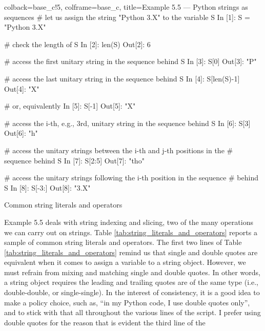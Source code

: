 \documentclass[a4paper,11pt]{book}
\newcommand{\question}[1]{%
    \begin{tcolorbox}[colback=comp_c!10,colframe=comp_c,sidebyside align=top,width=\linewidth,before skip=1ex]
        #1
    \end{tcolorbox}%
    \switchcolumn%
}
\newcommand{\note}[1]{%
    \begin{tcolorbox}[colback=white!0,colframe=white!10,width=\linewidth,before skip=1ex]
        #1
    \end{tcolorbox}         
}
\begin{document}
\begin{pythoncode}[linenos=true,]{colback=base_c!5, colframe=base_c, title=\sffamily Example 5.5 --- Python strings as sequences}
# let us assign the string "Python 3.X" to the variable S
In [1]: S = "Python 3.X"

# check the length of S
In [2]: len(S)
Out[2]: 6

# access the first unitary string in the sequence behind S 	
In [3]: S[0]
Out[3]: "P"

# access the last unitary string in the sequence behind S
In [4]: S[len(S)-1]
Out[4]: "X"

# or, equivalently
In [5]: S[-1]
Out[5]: "X"

# access the i-th, e.g., 3rd, unitary string in the sequence behind S
In [6]: S[3]
Out[6]: "h"

# access the unitary strings between the i-th and j-th positions in the 
# sequence behind S
In [7]: S[2:5]
Out[7]: "tho"

# access the unitary strings following the i-th position in the sequence 
# behind S
In [8]: S[-3:]
Out[8]: "3.X"

\end{pythoncode}

\begin{paracol}{2}
	\question{\raggedright Common string literals and operators}
	\note{Example 5.5 deals with string indexing and slicing, two of the many operations we can carry out on strings. Table \ref{tab:string_literals_and_operators} reports a sample of common string literals and operators. The first two lines of Table \ref{tab:string_literals_and_operators} remind us that single and double quotes are equivalent when it comes to assign a variable to a string object. However, we must refrain from mixing and matching single and double quotes. In other words, a string object requires the leading and trailing quotes are of the same type (i.e., double-double, or single-single). In the interest of consistency, it is a good idea to make a policy choice, such as, ``in my Python code, I use double quotes only'', and to stick with that all throughout the various lines of the script. I prefer using double quotes for the reason that is evident the third line of the }
\end{paracol}
\end{document}
